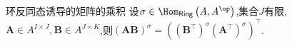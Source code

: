 \begin{proposition}{环反同态诱导的矩阵的乘积}{}
	设$\sigma\in\Hom_{\mathsf{Ring}}\left(A,A^{\op}\right)$,集合$J$有限,$\boldsymbol{A}\in A^{I\times J},\boldsymbol{B}\in A^{J\times K}$,则$\left(\boldsymbol{A}\boldsymbol{B}\right)^{\sigma}=\left(\left(\boldsymbol{B}^{\top}\right)^{\sigma}\left(\boldsymbol{A}^{\top}\right)^{\sigma}\right)^{\top}$.
\end{proposition}